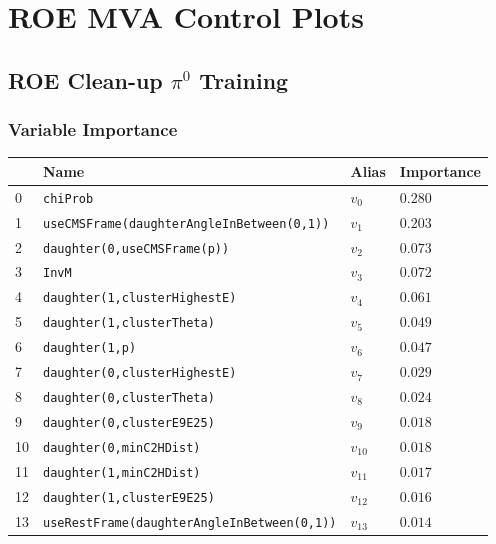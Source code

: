 \chapter{ROE MVA Control Plots}\label{sec:roe-control-plots}
\section{ROE Clean-up \texorpdfstring{$\pi^0$}{pi0} Training}\label{sec:ROE_pi0}

\subsection{Variable Importance}

\begin{longtable}{| p{} | p{} | p{} |p{} |}
\hline
& Name & Alias & Importance \\ \hline
0 &\texttt{\footnotesize chiProb} & $v_{0}$ & $0.280$ \\ \hline
1 &\texttt{\footnotesize useCMSFrame(daughterAngleInBetween(0,1))} & $v_{1}$ & $0.203$ \\ \hline
2 &\texttt{\footnotesize daughter(0,useCMSFrame(p))} & $v_{2}$ & $0.073$ \\ \hline
3 &\texttt{\footnotesize InvM} & $v_{3}$ & $0.072$ \\ \hline
4 &\texttt{\footnotesize daughter(1,clusterHighestE)} & $v_{4}$ & $0.061$ \\ \hline
5 &\texttt{\footnotesize daughter(1,clusterTheta)} & $v_{5}$ & $0.049$ \\ \hline
6 &\texttt{\footnotesize daughter(1,p)} & $v_{6}$ & $0.047$ \\ \hline
7 &\texttt{\footnotesize daughter(0,clusterHighestE)} & $v_{7}$ & $0.029$ \\ \hline
8 &\texttt{\footnotesize daughter(0,clusterTheta)} & $v_{8}$ & $0.024$ \\ \hline
9 &\texttt{\footnotesize daughter(0,clusterE9E25)} & $v_{9}$ & $0.018$ \\ \hline
10 &\texttt{\footnotesize daughter(0,minC2HDist)} & $v_{10}$ & $0.018$ \\ \hline
11 &\texttt{\footnotesize daughter(1,minC2HDist)} & $v_{11}$ & $0.017$ \\ \hline
12 &\texttt{\footnotesize daughter(1,clusterE9E25)} & $v_{12}$ & $0.016$ \\ \hline
13 &\texttt{\footnotesize useRestFrame(daughterAngleInBetween(0,1))} & $v_{13}$ & $0.014$ \\ \hline

\end{longtable}
